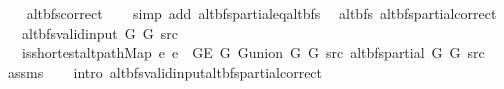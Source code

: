 \begin{isabellebody}
%
\isadelimproof
\ \ %
\endisadelimproof
%
\isatagproof
{}\isamarkupfalse%
\ alt{\isacharunderscore}{\kern0pt}bfs{\isacharunderscore}{\kern0pt}correct\isanewline
\ \ \isamarkupfalse%
\ {\isacharparenleft}{\kern0pt}simp\ add{\isacharcolon}{\kern0pt}\ alt{\isacharunderscore}{\kern0pt}bfs{\isacharunderscore}{\kern0pt}partial{\isacharunderscore}{\kern0pt}eq{\isacharunderscore}{\kern0pt}alt{\isacharunderscore}{\kern0pt}bfs{\isacharparenright}{\kern0pt}%
\endisatagproof
{\isafoldproof}%
%
\isadelimproof
\isanewline
%
\endisadelimproof
\isanewline
{}\isamarkupfalse%
\ {\isacharparenleft}{\kern0pt}\ alt{\isacharunderscore}{\kern0pt}bfs{\isacharparenright}{\kern0pt}\ alt{\isacharunderscore}{\kern0pt}bfs{\isacharunderscore}{\kern0pt}partial{\isacharunderscore}{\kern0pt}correct{\isacharcolon}{\kern0pt}\isanewline
\ \ \ {\isachardoublequoteopen}alt{\isacharunderscore}{\kern0pt}bfs{\isacharunderscore}{\kern0pt}valid{\isacharunderscore}{\kern0pt}input{\isacharprime}{\kern0pt}\ G{}\ G{}\ src{\isachardoublequoteclose}\isanewline
\ \ \ {\isachardoublequoteopen}is{\isacharunderscore}{\kern0pt}shortest{\isacharunderscore}{\kern0pt}alt{\isacharunderscore}{\kern0pt}path{\isacharunderscore}{\kern0pt}Map\ {\isacharparenleft}{\kern0pt}{\isasymlambda}e{\isachardot}{\kern0pt}\ e\ {\isasymin}\ G{\isachardot}{\kern0pt}E\ G{}{\isacharparenright}{\kern0pt}\ {\isacharparenleft}{\kern0pt}G{\isachardot}{\kern0pt}union\ G{}\ G{}{\isacharparenright}{\kern0pt}\ src\ {\isacharparenleft}{\kern0pt}alt{\isacharunderscore}{\kern0pt}bfs{\isacharunderscore}{\kern0pt}partial\ G{}\ G{}\ src{\isacharparenright}{\kern0pt}{\isachardoublequoteclose}\isanewline
%
\isadelimproof
\ \ %
\endisadelimproof
%
\isatagproof
{}\isamarkupfalse%
\ assms\isanewline
\ \ \isamarkupfalse%
\ {\isacharparenleft}{\kern0pt}intro\ alt{\isacharunderscore}{\kern0pt}bfs{\isacharunderscore}{\kern0pt}valid{\isacharunderscore}{\kern0pt}input{\isachardot}{\kern0pt}alt{\isacharunderscore}{\kern0pt}bfs{\isacharunderscore}{\kern0pt}partial{\isacharunderscore}{\kern0pt}correct{\isacharparenright}{\kern0pt}%
\endisatagproof
{\isafoldproof}%
%
\isadelimproof
\isanewline
%
\endisadelimproof
%
\isadelimtheory
\isanewline
%
\endisadelimtheory
%
\isatagtheory
{}\isamarkupfalse%
%
\endisatagtheory
{\isafoldtheory}%
%
\isadelimtheory
%
\endisadelimtheory
%
\end{isabellebody}%
